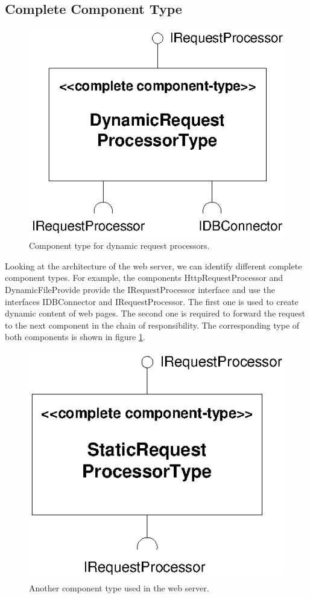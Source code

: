 \subsection{Complete Component Type}

\begin{figure}[htbp]
\centering
\includegraphics[scale=0.85]{example/DynamicRequestProcessorType}
\caption{Component type for dynamic request processors.}
\label{fig:DynamicRequestProcessorType}
\end{figure}

Looking at the architecture of the web server, we can identify different
complete component types. For example, the components HttpRequestProcessor and
DynamicFileProvide provide the IRequestProcessor interface and use the
interfaces IDBConnector and IRequestProcessor. The first one is used to create
dynamic content of web pages. The second one is required to forward the request
to the next component in the chain of responsibility. The corresponding type of
both components is shown in figure \ref{fig:DynamicRequestProcessorType}.

\begin{figure}[htbp]
\centering
\includegraphics[scale=0.85]{example/RequestProcessorType}
\caption{Another component type used in the web server.}
\label{fig:RequestProcessorType}
\end{figure}

